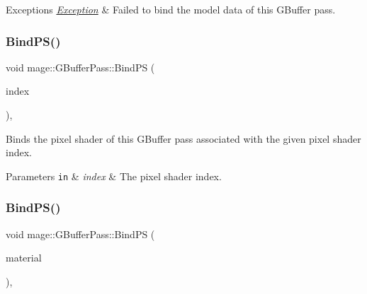 \begin{DoxyExceptions}{Exceptions}
{\em \hyperlink{classmage_1_1_exception}{Exception}} & Failed to bind the model data of this G\+Buffer pass. \\
\hline
\end{DoxyExceptions}
\hypertarget{classmage_1_1_g_buffer_pass_a750c27aa6f562b53d62f845ce50e731d}{}\label{classmage_1_1_g_buffer_pass_a750c27aa6f562b53d62f845ce50e731d} 
\subsubsection{\texorpdfstring{Bind\+P\+S()}{BindPS()}\hspace{0.1cm}{\footnotesize\ttfamily [1/2]}}
{\footnotesize\ttfamily void mage\+::\+G\+Buffer\+Pass\+::\+Bind\+PS (\begin{DoxyParamCaption}\item[{\hyperlink{classmage_1_1_g_buffer_pass_a23039b6695c10c88676c38fe63123571}{P\+S\+Index}}]{index }\end{DoxyParamCaption})\hspace{0.3cm}{\ttfamily [private]}, {\ttfamily [noexcept]}}

Binds the pixel shader of this G\+Buffer pass associated with the given pixel shader index.


\begin{DoxyParams}[1]{Parameters}
\mbox{\tt in}  & {\em index} & The pixel shader index. \\
\hline
\end{DoxyParams}
\hypertarget{classmage_1_1_g_buffer_pass_afe16e10cc6d3c7d56d387eb1fe2a66ee}{}\label{classmage_1_1_g_buffer_pass_afe16e10cc6d3c7d56d387eb1fe2a66ee} 
\subsubsection{\texorpdfstring{Bind\+P\+S()}{BindPS()}\hspace{0.1cm}{\footnotesize\ttfamily [2/2]}}
{\footnotesize\ttfamily void mage\+::\+G\+Buffer\+Pass\+::\+Bind\+PS (\begin{DoxyParamCaption}\item[{const \hyperlink{classmage_1_1_material}{Material} \&}]{material }\end{DoxyParamCaption})\hspace{0.3cm}{\ttfamily [private]}, {\ttfamily [noexcept]}}

